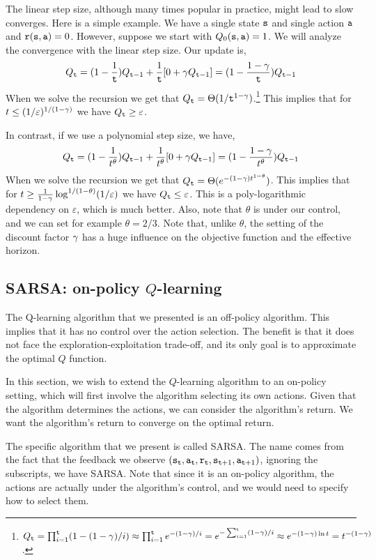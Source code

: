The linear step size, although many times popular in practice, might
lead to slow converges. Here is a simple example. We have a single
state ${\tt s}$ and single action ${\tt a}$ and
${\tt r}({\tt s},{\tt a})=0$. However, suppose we start with
$Q_0({\tt s},{\tt a})=1$. We will analyze the convergence with the
linear step size. Our update is,
\[
Q_{\tt t} =
(1-\frac{1}{{\tt t}})Q_{{\tt t}-1}+\frac{1}{{\tt t}}[0+\gamma
Q_{{\tt t}-1}]=(1-\frac{1-\gamma}{{\tt t}})Q_{{\tt t}-1}
\]
When we solve the recursion we get that
$Q_{\tt t}=\Theta(1/{\tt t}^{1-\gamma})$.\footnote{$Q_{\tt t}=\prod_{i=1}^{\tt t} (1-(1-\gamma)/i)\approx
\prod_{i=1}^{\tt t} e^{-(1-\gamma)/i}=e^{-\sum_{i=1}^{\tt t}
(1-\gamma)/i }\approx e^{-(1-\gamma)\ln
t}=t^{-(1-\gamma)}$. }
%
This implies that for $t\leq  (1/\varepsilon)^{1/(1-\gamma)}$ we
have $Q_{\tt t} \geq \varepsilon$.

In contrast, if we use a polynomial step size, we have,
\[
Q_{\tt t} =
(1-\frac{1}{t^\theta})Q_{{\tt t}-1}+\frac{1}{t^\theta}[0+\gamma
Q_{{\tt t}-1}]=(1-\frac{1-\gamma}{t^\theta})Q_{{\tt t}-1}
\]
When we solve the recursion we get that
$Q_{\tt t}=\Theta(e^{-(1-\gamma)t^{1-\theta}})$. This implies that
for $t\geq \frac{1}{1-\gamma}\log^{1/(1-\theta)} (1/\varepsilon)$
we have $Q_{\tt t} \leq \varepsilon$. This is a poly-logarithmic
dependency on $\varepsilon$, which is much better. Also, note that
$\theta$ is under our control, and we can set for example
$\theta=2/3$. Note that, unlike $\theta$, the setting of the discount
factor $\gamma$ has a huge influence on the objective function
and the effective horizon.

\subsection{SARSA: on-policy $Q$-learning}

The Q-learning algorithm that we presented is an off-policy algorithm. This implies that it has no control over the action selection. The benefit is that it does not face the exploration-exploitation trade-off, and its only goal is to approximate the optimal $Q$ function.

In this section, we wish to extend the $Q$-learning algorithm to an on-policy setting, which will first involve the algorithm selecting its own actions. Given that the algorithm determines the actions, we can consider the algorithm's return. We want the algorithm's return to converge on the optimal return.

The specific algorithm that we present is called SARSA. The name comes from the fact that the feedback we observe $({\tt s}_{\tt t},{\tt a}_{\tt t},{\tt r}_{\tt t},{\tt s}_{{\tt t}+1},{\tt a}_{{\tt t}+1})$, ignoring the subscripts, we have SARSA. Note that since it is an on-policy algorithm, the actions are actually under the algorithm's control, and we would need to specify how to select them.

